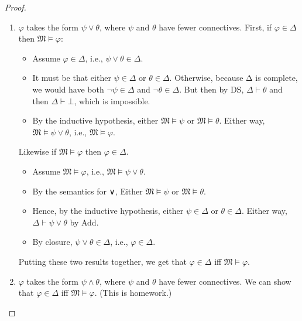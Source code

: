 \documentclass[12pt]{report}
\theoremstyle{nonumberplain}
\newtheorem{proof}{Proof}
\newcommand{\M}{\mathfrak{M}}
\begin{document}
\begin{proof}
\begin{enumerate}
\begin{enumerate}[label={Case (\alph*):}]
\item $φ$ takes the form $ψ ∨ θ$, where $ψ$ and $θ$ have fewer connectives. First, if $φ ∈ Δ$ then $\M ⊨ φ$:
\begin{itemize}[nolistsep,leftmargin=*]
    \item Assume $φ ∈ Δ$, i.e., $ψ ∨ θ ∈ Δ$.
    \item It must be that either $ψ ∈ Δ$ or $θ ∈ Δ$. Otherwise, because Δ is complete, we would have both $¬ψ ∈ Δ$ and $¬θ ∈ Δ$. But then by DS, $Δ ⊢ θ$ and then $Δ ⊢ ⊥$, which is impossible.
    \item By the inductive hypothesis, either $\M ⊨ ψ$ or $\M ⊨ θ$. Either way, $\M ⊨ ψ ∨ θ$, i.e., $\M ⊨ φ$.
\end{itemize}
Likewise if $\M ⊨ φ$ then $φ ∈ Δ$.
\begin{itemize}[nolistsep,leftmargin=*]
    \item Assume $\M ⊨ φ$, i.e., $\M ⊨ ψ ∨ θ$.
    \item By the semantics for ∨, Either $\M ⊨ ψ$ or $\M ⊨ θ$.
    \item Hence, by the inductive hypothesis, either $ψ ∈ Δ$ or $θ ∈ Δ$. Either way, $Δ ⊢ ψ ∨ θ$ by Add.
    \item By closure, $ψ ∨ θ ∈ Δ$, i.e., $φ ∈ Δ$.
\end{itemize}
Putting these two results together, we get that $φ ∈Δ$ iff $\M ⊨ φ$.


\item $φ$ takes the form $ψ ∧ θ$, where $ψ$ and $θ$ have fewer connectives. We can show that $φ ∈ Δ$ iff $\M ⊨ φ$. (This is homework.)\label{tm:conj}


\end{enumerate}
\end{enumerate}
\end{proof}
\end{document}

